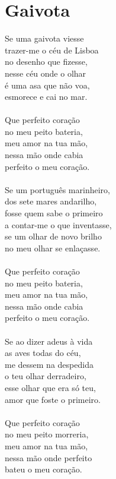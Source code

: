 \documentclass{article}
\begin{document}
\section{ Gaivota}
Se uma gaivota viesse\\
trazer-me o céu de Lisboa\\
no desenho que fizesse,\\
nesse céu onde o olhar\\
é uma asa que não voa,\\
esmorece e cai no mar.\\
\\
Que perfeito coração\\
no meu peito bateria,\\
meu amor na tua mão,\\
nessa mão onde cabia\\
perfeito o meu coração.\\
\\
Se um português marinheiro,\\
dos sete mares andarilho,\\
fosse quem sabe o primeiro\\
a contar-me o que inventasse,\\
se um olhar de novo brilho\\
no meu olhar se enlaçasse.\\
\\
Que perfeito coração\\
no meu peito bateria,\\
meu amor na tua mão,\\
nessa mão onde cabia\\
perfeito o meu coração.\\
\\
Se ao dizer adeus à vida\\
as aves todas do céu,\\
me dessem na despedida\\
o teu olhar derradeiro,\\
esse olhar que era só teu,\\
amor que foste o primeiro.\\
\\
Que perfeito coração\\
no meu peito morreria,\\
meu amor na tua mão,\\
nessa mão onde perfeito\\
bateu o meu coração.\\
\\
\\
\\
\end{document}
